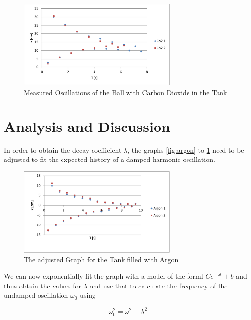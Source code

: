 \documentclass{scrreprt}
\begin{document}
\begin{figure}[H]
	\centering
  \includegraphics[width=0.7\textwidth]{diag/co2.pdf}
	\caption{Measured Oscillations of the Ball with Carbon Dioxide in the Tank}
	\label{fig:co2}
\end{figure}

\newpage
\section{Analysis and Discussion}
In order to obtain the decay coefficient $\lambda$, the graphs \ref{fig:argon} to \ref{fig:co2} need to be adjusted to fit the expected history of a damped harmonic oscillation. 

\begin{figure}[H]
	\centering
  \includegraphics[width=0.7\textwidth]{diag/argon_adjusted.pdf}
	\caption{The adjusted Graph for the Tank filled with Argon}
	\label{fig:argon_adjusted}
\end{figure}

We can now exponentially fit the graph with a model of the forml $C e^{-\lambda t} + b$ and thus obtain the values for $\lambda$ and use that to calculate the frequency of the undamped oscillation $\omega_0$ using

\begin{equation}
\omega_0^2=\omega^2+\lambda^2
\end{equation}
\end{document}
